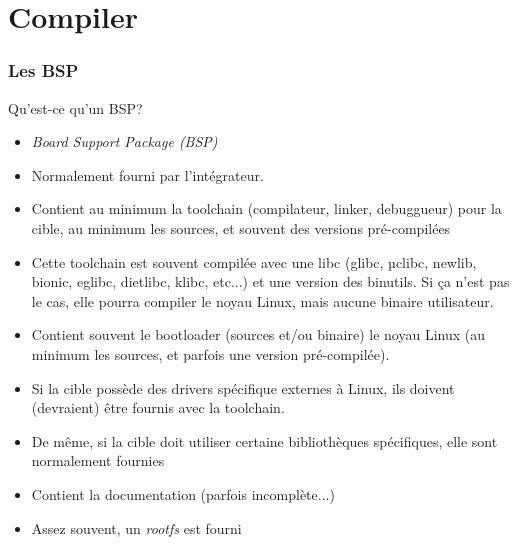 %
%
%

\part{Compiler}

\begin{frame}
  \partpage
\end{frame}

\begin{frame}
  \tableofcontents
\end{frame}

\section{Les BSP}

\begin{frame}[fragile=singleslide]{Qu'est-ce qu'un BSP?}
  \begin{itemize} 
  \item \emph{Board Support Package (BSP)}
  \item Normalement fourni par l'intégrateur.
  \item  Contient  au   minimum  la  toolchain  (compilateur,  linker,
    debuggueur) pour la cible, au  minimum les sources, et souvent des
    versions pré-compilées
  \item  Cette toolchain est  souvent compilée  avec une  libc (glibc,
    µclibc, newlib,  bionic, eglibc,  dietlibc, klibc, etc...)  et une
    version des binutils. Si ça n'est pas le cas, elle pourra compiler
    le noyau Linux, mais aucune binaire utilisateur.
  \item  Contient souvent  le  bootloader (sources  et/ou binaire)  le
    noyau  Linux  (au minimum  les  sources,  et  parfois une  version
    pré-compilée).
  \item Si la  cible possède des drivers spécifique  externes à Linux,
    ils doivent (devraient) être fournis avec la toolchain.
  \item  De même,  si la  cible doit  utiliser  certaine bibliothèques
    spécifiques, elle sont normalement fournies
  \item Contient la documentation (parfois incomplète...)
  \item Assez souvent, un \emph{rootfs} est fourni
  \end{itemize} 
\end{frame} 

